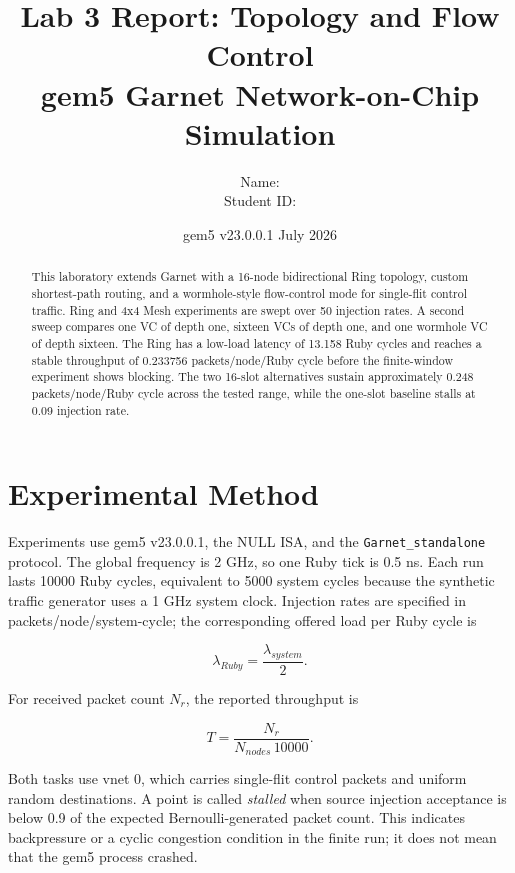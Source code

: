 \documentclass[11pt,a4paper]{article}
\title{\textbf{Lab 3 Report: Topology and Flow Control}\\[0.4em]
       \large gem5 Garnet Network-on-Chip Simulation}
\author{\begin{tabular}{rl}
          Name: & \rule{7cm}{0.4pt} \\
          Student ID: & \rule{7cm}{0.4pt}
        \end{tabular}}
\date{gem5 v23.0.0.1 \quad July 2026}
\newcommand{\code}[1]{\texttt{#1}}
\begin{document}
\maketitle

\begin{abstract}
This laboratory extends Garnet with a 16-node bidirectional Ring topology,
custom shortest-path routing, and a wormhole-style flow-control mode for
single-flit control traffic. Ring and 4x4 Mesh experiments are swept over 50
injection rates. A second sweep compares one VC of depth one, sixteen VCs of
depth one, and one wormhole VC of depth sixteen. The Ring has a low-load
latency of 13.158 Ruby cycles and reaches a stable throughput of 0.233756
packets/node/Ruby cycle before the finite-window experiment shows blocking.
The two 16-slot alternatives sustain approximately 0.248 packets/node/Ruby
cycle across the tested range, while the one-slot baseline stalls at 0.09
injection rate.
\end{abstract}

\tableofcontents
\newpage

\section{Experimental Method}

Experiments use gem5 v23.0.0.1, the NULL ISA, and the
\code{Garnet\_standalone} protocol. The global frequency is 2 GHz, so one
Ruby tick is 0.5 ns. Each run lasts 10000 Ruby cycles, equivalent to 5000
system cycles because the synthetic traffic generator uses a 1 GHz system
clock. Injection rates are specified in packets/node/system-cycle; the
corresponding offered load per Ruby cycle is

\begin{equation}
  \lambda_{Ruby}=\frac{\lambda_{system}}{2}.
\end{equation}

For received packet count $N_r$, the reported throughput is

\begin{equation}
  T=\frac{N_r}{N_{nodes}\,10000}.
\end{equation}

Both tasks use vnet 0, which carries single-flit control packets and uniform
random destinations. A point is called \emph{stalled} when source injection
acceptance is below 0.9 of the expected Bernoulli-generated packet count. This
indicates backpressure or a cyclic congestion condition in the finite run; it
does not mean that the gem5 process crashed.
\end{document}
